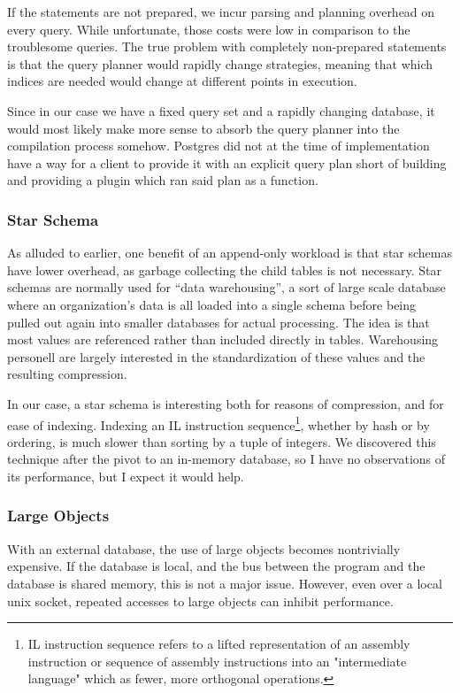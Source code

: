 If the statements are not prepared, we incur parsing and planning overhead on every query.
While unfortunate, those costs were low in comparison to the troublesome queries.
The true problem with completely non-prepared statements is that the query planner would rapidly change strategies, meaning that which indices are needed would change at different points in execution.

Since in our case we have a fixed query set and a rapidly changing database, it would most likely make more sense to absorb the query planner into the compilation process somehow.
Postgres did not at the time of implementation have a way for a client to provide it with an explicit query plan short of building and providing a plugin which ran said plan as a function.

\subsubsection{Star Schema}
As alluded to earlier, one benefit of an append-only workload is that star schemas have lower overhead, as garbage collecting the child tables is not necessary.
Star schemas are normally used for ``data warehousing'', a sort of large scale database where an organization's data is all loaded into a single schema before being pulled out again into smaller databases for actual processing.
The idea is that most values are referenced rather than included directly in tables.
Warehousing personell are largely interested in the standardization of these values and the resulting compression.

In our case, a star schema is interesting both for reasons of compression, and for ease of indexing.
Indexing an IL instruction sequence\footnote{
IL instruction sequence refers to a lifted representation of an assembly instruction or sequence of assembly instructions into an "intermediate language" which as fewer, more orthogonal operations.
}, whether by hash or by ordering, is much slower than sorting by a tuple of integers.
We discovered this technique after the pivot to an in-memory database, so I have no observations of its performance, but I expect it would help.

\subsubsection{Large Objects}
With an external database, the use of large objects becomes nontrivially expensive.
If the database is local, and the bus between the program and the database is shared memory, this is not a major issue.
However, even over a local unix socket, repeated accesses to large objects can inhibit performance.


